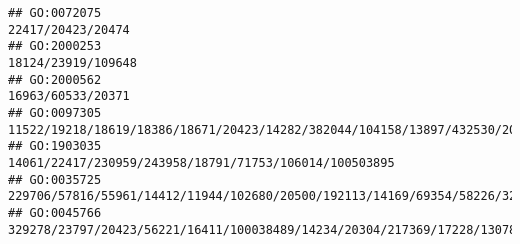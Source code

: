\documentclass[
]{article}
\begin{document}
\begin{verbatim}
## GO:0072075                                                                                                                                                                                                                                                                                                                                                                                            22417/20423/20474
## GO:2000253                                                                                                                                                                                                                                                                                                                                                                                           18124/23919/109648
## GO:2000562                                                                                                                                                                                                                                                                                                                                                                                            16963/60533/20371
## GO:0097305                                                                                                                                                                                                                                                                                   11522/19218/18619/18386/18671/20423/14282/382044/104158/13897/432530/20306/12775/20701/20704/13078/12475/15566/11551/20371
## GO:1903035                                                                                                                                                                                                                                                                                                                                                       14061/22417/230959/243958/18791/71753/106014/100503895
## GO:0035725                                                                                                                                                                                                                                                                                                                                  229706/57816/55961/14412/11944/102680/20500/192113/14169/69354/58226/329064
## GO:0045766                                                                                                                                                                                                                                                                                                                                329278/23797/20423/56221/16411/100038489/14234/20304/217369/17228/13078/12766

\end{verbatim}
\end{document}
